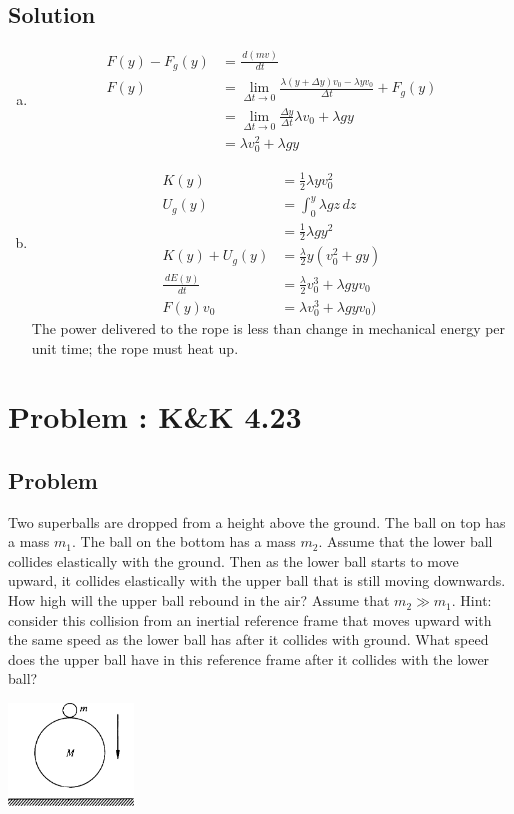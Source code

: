 \documentclass[solutions]{esg8012pset}
\renewcommand{\d}{\,d}
\begin{document}
\subsection{Solution}
  \begin{enumerate}[a)]
    \item
  \begin{align*}
    F(y) - F_g(y) & = \frac{\d (m v)}{\d t} \\
    F(y) & = \lim_{\Delta t \rightarrow 0} \frac{\lambda (y+\Delta y) v_0 - \lambda y v_0}{\Delta t} + F_g(y) \\
    & = \lim_{\Delta t \rightarrow 0} \frac{\Delta y}{\Delta t} \lambda v_0 + \lambda g y \\
    & = \lambda v_0^2 + \lambda g y
  \end{align*}
    \item \begin{align*}
    K(y) & = \frac{1}{2}\lambda y v_0^2 \\
    U_g(y) & = \int_{0}^y \lambda g z \d z \\
          & = \frac{1}{2}\lambda g y^2 \\
    K(y) + U_g(y) & = \frac{\lambda}{2} y(v_0^2 + g y) \\
    \frac{\d E(y)}{\d t} & = \frac{\lambda}{2} v_0^3 + \lambda g y v_0 \\
    F(y)v_0 & = \lambda v_0^3 + \lambda g y v_0)
    \end{align*} The power delivered to the rope is less than change in mechanical energy per unit time; the rope must heat up.  %
  \end{enumerate}
\section{Problem \thesection: K\&K 4.23}
\subsection{Problem}
  Two superballs are dropped from a height above the ground. The ball on top has a mass $m_1$. The ball on the bottom has a mass $m_2$. Assume that the lower ball collides elastically with the ground. Then as the lower ball starts to move upward, it collides elastically with the upper ball that is still moving downwards. How high will the upper ball rebound in the air? Assume that $m_2 \gg m_1$. Hint: consider this collision from an inertial reference frame that moves upward with the same speed as the lower ball has after it collides with ground. What speed does the upper ball have in this reference frame after it collides with the lower ball?
  \begin{center}\includegraphics[width=0.25\textwidth]{ps07_2}\end{center}
\end{document}
